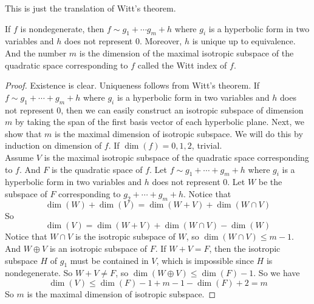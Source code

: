 \documentclass[15pt]{scrartcl}
\begin{document}
This is just the translation of Witt's theorem.
\begin{corollary}
    If $f$ is nondegenerate, then $f\sim g_1+\cdots g_m+h$ where $g_i$ is a hyperbolic form in two variables and $h$ does not represent $0$. Moreover, $h$ is unique up to equivalence. And the number $m$ is the dimension of the maximal isotropic subspace of the quadratic space corresponding to $f$ called the Witt index of $f$.
\end{corollary}
\begin{proof}
    Existence is clear. Uniqueness follows from Witt's theorem. If $f\sim g_1+\cdots +g_m+h$ where $g_i$ is a hyperbolic form in two variables and $h$ does not represent $0$, then we can easily construct an isotropic subspace of dimension $m$ by taking the span of the first basis vector of each hyperbolic plane. Next, we show that $m$ is the maximal dimension of isotropic subspace. We will do this by induction on dimension of $f$. If $\dim(f)=0,1,2$, trivial. 
    \\

    Assume $V$ is the maximal isotropic subspace of the quadratic space corresponding to $f$. And $F$ is the quadratic space of $f$. Let $f\sim g_1+\cdots +g_m+h$ where $g_i$ is a hyperbolic form in two variables and $h$ does not represent $0$. Let $W$ be the subspace of $F$ corresponding to $g_2+\cdots +g_m+h$. Notice that 
    \[\dim(W)+\dim(V)=\dim(W+V)+\dim(W\cap V)\]
    So 
    \[\dim(V)=\dim(W+V)+\dim(W\cap V)-\dim(W)\]
    Notice that $W\cap V$ is the isotropic subspace of $W$, so $\dim(W\cap V)\leq m-1$. And $W\oplus V$ is an isotropic subspace of $F$. If $W+ V=F$, then the isotropic subspace $H$ of $g_1$ must be contained in $V$, which is impossible since $H$ is nondegenerate. So $W+V\neq F$, so $\dim(W\oplus V)\leq \dim(F)-1$. So we have
    \[\dim(V)\leq \dim(F)-1+m-1-\dim(F)+2=m\]
    So $m$ is the maximal dimension of isotropic subspace.
\end{proof}
\end{document}
